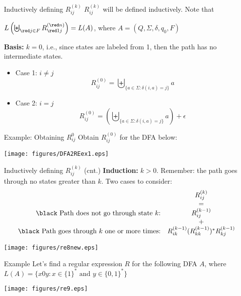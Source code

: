 \documentclass{prosper}%
\begin{document}
\begin{slide}{Inductively defining $R_{ij}^{(k)}$}
$R_{ij}^{(k)}$ will be defined inductively. Note that
\begin{center}
\(
L\left(\biguplus_{\red j\in F}R_{\red 1j}^{({\red n})}\right) = L(A)
\), where $A=(Q, \Sigma, \delta, q_0, F)$
\end{center}
{\bf Basis:} $k=0$, i.e., since states are labeled from 1, then the path has no intermediate states.
\begin{minipage}{7cm}
\begin{itemize}
\item Case 1: $i\neq j$
\[
R^{(0)}_{ij}=\biguplus_{\{a\in\Sigma : \delta(i,a)=j\}}a
\]
\item Case 2: $i= j$
\[
R^{(0)}_{ij}=\left(\biguplus_{\{a\in\Sigma : \delta(i,a)=j\}}a\right)+\epsilon
\]
\end{itemize}
\end{minipage}
\end{slide}

\begin{slide}{Example: Obtaining $R^0_{ij}$}
Obtain $R^{(0)}_{ij}$ for the DFA below:
\vspace{1cm}
\begin{center}
\texttt{[image: figures/DFA2REex1.eps]}
\end{center}
\end{slide}

\begin{slide}{Inductively defining $R_{ij}^{(k)}$ (cnt.)}
{\bf Induction:} $k>0$. Remember: the path goes through no states greater than $k$. Two cases to consider:{\blue
\[
\begin{array}{rc}
&R^{(k)}_{ij}\\
&=\\
\mbox{\black Path does not go through state $k$:} & R^{(k-1)}_{ij}\\
&+\\
\mbox{\black Path goes through $k$ one or more times:} & R^{(k-1)}_{ik}(R^{(k-1)}_{kk})^*R^{(k-1)}_{kj}
\end{array}
\]}
\begin{center}
\texttt{[image: figures/re8new.eps]}
\end{center}
\end{slide}

\begin{slide}{Example}
Let's find a regular expression $R$ for the following DFA $A$, where $L(A)=\{x0y:x\in\{1\}^*\mbox{ and }y \in \{0,1\}^*\}$
\begin{center}
\texttt{[image: figures/re9.eps]}
\end{center}
\end{slide}
\end{document}
